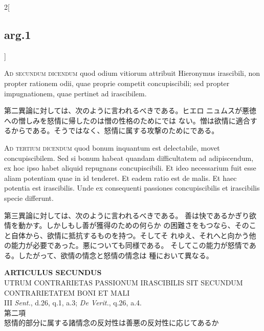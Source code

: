 \documentclass[paper=a4paper,fontsize=10pt,jafontsize=9pt,titlepage]{jlreq}
\begin{document}
\begin{paracol}{2}[\subsection{arg.1}]
\switchcolumn*[\subsection{ad.2}]

{\scshape Ad secundum dicendum} quod odium vitiorum attribuit Hieronymus
irascibili, non propter rationem odii, quae proprie competit
concupiscibili; sed propter impugnationem, quae pertinet ad irascibilem.

\switchcolumn

第二異論に対しては、次のように言われるべきである。ヒエロ
 ニュムスが悪徳への憎しみを怒情に帰したのは憎の性格のためにでは
 ない。憎は欲情に適合するからである。そうではなく、怒情に属する攻撃のためにである。

\switchcolumn*[\subsection{ad.3}]

{\scshape Ad tertium dicendum} quod bonum inquantum est delectabile, movet
concupiscibilem. Sed si bonum habeat quandam difficultatem ad
adipiscendum, ex hoc ipso habet aliquid repugnans concupiscibili. Et
ideo necessarium fuit esse aliam potentiam quae in id tenderet. Et eadem
ratio est de malis. Et haec potentia est irascibilis. Unde ex
consequenti passiones concupiscibilis et irascibilis specie differunt.

\switchcolumn

第三異論に対しては、次のように言われるべきである。
善は快であるかぎり欲情を動かす。しかしもし善が獲得のための何らか
 の困難さをもつなら、そのこと自体から、欲情に抵抗するものを持つ。そしてそ
 れゆえ、それへと向かう他の能力が必要であった。悪についても同様である。
 そしてこの能力が怒情である。したがって、欲情の情念と怒情の情念は
 種において異なる。

\end{paracol}
\newpage
{}
{}
\setcounter{section}{2}
\setcounter{subsection}{0}


\begin{center}
{\Large {\bfseries ARTICULUS SECUNDUS}}\\
{\large UTRUM CONTRARIETAS PASSIONUM IRASCIBILIS SIT SECUNDUM
 CONTRARIETATEM BONI ET MALI}\\
{\footnotesize III {\itshape Sent.}, d.26, q.1, a.3; {\itshape De
 Verit.}, q.26, a.4.}\\
{\Large 第二項\\怒情的部分に属する諸情念の反対性は善悪の反対性に応じてあるか}
\end{center}
\end{document}
